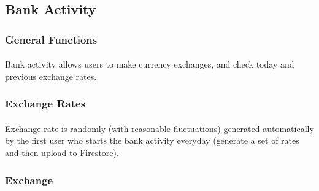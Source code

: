 \documentclass[12pt]{article}
\begin{document}
\subsection{Bank Activity}
\subsubsection{General Functions}
\paragraph{}
Bank activity allows users to make currency exchanges, and check today and previous exchange rates.
\subsubsection{Exchange Rates}
\paragraph{}
Exchange rate is randomly (with reasonable fluctuations) generated automatically by the first user who starts the bank activity everyday (generate a set of rates and then upload to Firestore).
\subsubsection{Exchange}
\end{document}

